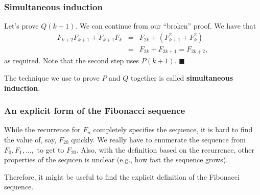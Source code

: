 \begin{frame}\frametitle{Simultaneous induction}
  Let's prove $Q(k+1)$. We can continue from our ``broken'' proof.  We
  have that
  \begin{eqnarray*}
    F_{k+2}F_{k+1}+F_{k+1}F_k
    &=& F_{2k} + (F_{k+1}^2 + F_k^2) \\
    &=& F_{2k} + F_{2k+1} = F_{2k+2},
  \end{eqnarray*}
  as required. Note that the second step uses $P(k+1)$. $\blacksquare$

  \vspace{0.2in}
  The technique we use to prove $P$ and $Q$ together is called {\bf
    simultaneous induction}.
\end{frame}

\begin{frame}\frametitle{An explicit form of the Fibonacci sequence}
  While the recurrence for $F_n$ completely specifies the sequence, it
  is hard to find the value of, say, $F_{20}$ quickly.  We really have
  to enumerate the sequence from $F_0,F_1,\ldots,$ to get to $F_{20}$.
  Also, with the definition based on the recurrence, other properties
  of the sequcen is unclear (e.g., how fast the sequence grows).

  Therefore, it might be useful to find the explicit definition of the
  Fibonacci sequence.
\end{frame}

